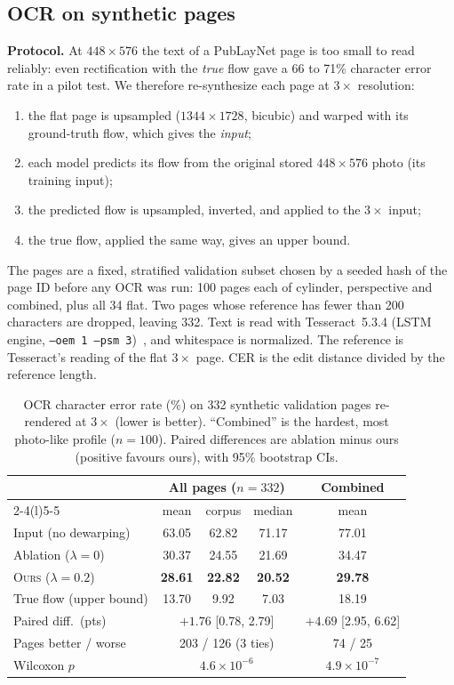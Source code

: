 \documentclass[conference]{IEEEtran}
\newcommand{\ours}{\textsc{Ours}}
\begin{document}
\subsection{OCR on synthetic pages}
\label{sec:ocrsyn}
\textbf{Protocol.} At $448\times576$ the text of a PubLayNet page is too small to read reliably: even rectification with the \emph{true} flow gave a 66 to 71\% character error rate in a pilot test. We therefore re-synthesize each page at $3\times$ resolution:
\begin{enumerate}
\item the flat page is upsampled ($1344\times1728$, bicubic) and warped with its ground-truth flow, which gives the \emph{input};
\item each model predicts its flow from the original stored $448\times576$ photo (its training input);
\item the predicted flow is upsampled, inverted, and applied to the $3\times$ input;
\item the true flow, applied the same way, gives an upper bound.
\end{enumerate}
The pages are a fixed, stratified validation subset chosen by a seeded hash of the page ID before any OCR was run: 100 pages each of cylinder, perspective and combined, plus all 34 flat. Two pages whose reference has fewer than 200 characters are dropped, leaving 332. Text is read with Tesseract~5.3.4 (LSTM engine, \texttt{--oem 1 --psm 3})~\cite{smith2007tesseract}, and whitespace is normalized. The reference is Tesseract's reading of the flat $3\times$ page. CER is the edit distance divided by the reference length.

\begin{table}[t]
\centering
\caption{OCR character error rate (\%) on 332 synthetic validation pages re-rendered at $3\times$ (lower is better). ``Combined'' is the hardest, most photo-like profile ($n=100$). Paired differences are ablation minus ours (positive favours ours), with 95\% bootstrap CIs.}
\label{tab:ocr}
\setlength{\tabcolsep}{5pt}
\begin{tabular}{@{}lcccc@{}}
\toprule
 & \multicolumn{3}{c}{All pages ($n=332$)} & Combined \\
\cmidrule(lr){2-4}\cmidrule(l){5-5}
 & mean & corpus & median & mean \\
\midrule
Input (no dewarping) & 63.05 & 62.82 & 71.17 & 77.01 \\
Ablation ($\lambda=0$) & 30.37 & 24.55 & 21.69 & 34.47 \\
\ours{} ($\lambda=0.2$) & \textbf{28.61} & \textbf{22.82} & \textbf{20.52} & \textbf{29.78} \\
True flow (upper bound) & 13.70 & 9.92 & 7.03 & 18.19 \\
\midrule
Paired diff.\ (pts) & \multicolumn{3}{c}{$+1.76$ [0.78, 2.79]} & $+4.69$ [2.95, 6.62] \\
Pages better / worse & \multicolumn{3}{c}{203 / 126 (3 ties)} & 74 / 25 \\
Wilcoxon $p$ & \multicolumn{3}{c}{$4.6\times10^{-6}$} & $4.9\times10^{-7}$ \\
\bottomrule
\end{tabular}
\end{table}
\end{document}
